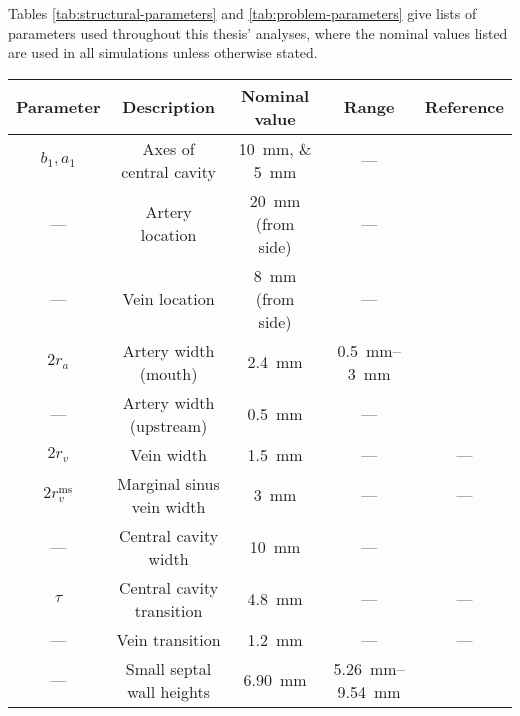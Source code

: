             Tables \ref{tab:structural-parameters} and \ref{tab:problem-parameters} give lists of parameters used throughout this thesis' analyses, where the nominal values listed are used in all simulations unless otherwise stated.

            \begin{table}
                \centering
                \begin{adjustwidth}{-1.5cm}{-1cm}
                    \begin{tabular}{c|c|c|c|c}
                        Parameter & Description & Nominal value & Range & Reference \\
                        \hline
                        $b_1, a_1$ & Axes of central cavity & \qtylist{10;5}{\milli\metre} & — & \cite{lecarpentierComputationalFluidDynamic2016} \\
                        — & Artery location & \qty{20}{\milli\metre} (from side) & — & \cite{chernyavskyMathematicalModelIntervillous2010,lecarpentierComputationalFluidDynamic2016} \\
                        — & Vein location & \qty{8}{\milli\metre} (from side) & — & \cite{chernyavskyMathematicalModelIntervillous2010,lecarpentierComputationalFluidDynamic2016} \\
                        $2r_a$ & Artery width (mouth) & \qty{2.4}{\milli\metre} & \qtyrange{0.5}{3}{\milli\metre} & \cite{burtonRheologicalPhysiologicalConsequences2009} \\
                        — & Artery width (upstream) & \qty{0.5}{\milli\metre} & — & \cite{burtonRheologicalPhysiologicalConsequences2009} \\
                        $2r_v$ & Vein width & \qty{1.5}{\milli\metre} & — & — \\
                        $2r^\text{ms}_v$ & Marginal sinus vein width & \qty{3}{\milli\metre} & — & — \\
                        — & Central cavity width & \qty{10}{\milli\metre} & — & \cite{lecarpentierComputationalFluidDynamic2016,chernyavskyMathematicalModelIntervillous2010} \\
                        $\tau$ & Central cavity transition & \qty{4.8}{\milli\metre} & — & — \\
                        — & Vein transition & \qty{1.2}{\milli\metre} & — & — \\
                        — & Small septal wall heights & \qty{6.90}{\milli\metre} & \qtyrange{5.26}{9.54}{\milli\metre} & \cite{AMANITIS2023e68} \\

\end{tabular}
\end{adjustwidth}
\end{table}
